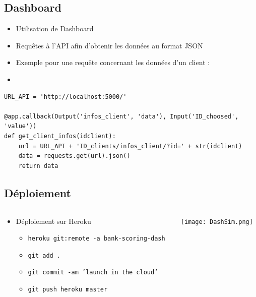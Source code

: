\documentclass[8pt,aspectratio=169,hyperref={unicode=true}]{beamer}
\begin{document}
\subsection{Dashboard}
\begin{frame}[fragile]{\insertsection}{\insertsubsection}
    \begin{itemize}
        \item Utilisation de Dashboard
        \item Requêtes à l'API afin d'obtenir les données au format JSON
        \item Exemple pour une requête concernant les données d'un client :
        \item[]
    \end{itemize}
    \begin{verbatim}
URL_API = 'http://localhost:5000/'

@app.callback(Output('infos_client', 'data'), Input('ID_choosed', 'value'))
def get_client_infos(idclient):
    url = URL_API + 'ID_clients/infos_client/?id=' + str(idclient)
    data = requests.get(url).json()
    return data 
            \end{verbatim}
\end{frame}

\subsection{Déploiement}
\begin{frame}{\insertsection}{\insertsubsection}
    \begin{columns}
        \begin{column}{.4\textwidth}
            \begin{itemize}
                \item Déploiement sur Heroku
                      \begin{itemize}
                          \item \texttt{heroku git:remote -a bank-scoring-dash}
                          \item \texttt{git add .}
                          \item \texttt{git commit -am 'launch in the cloud'}
                          \item \texttt{git push heroku master}
                      \end{itemize}
            \end{itemize}
        \end{column}
        \begin{column}{.6\textwidth}
            \texttt{[image: DashSim.png]}
        \end{column}
    \end{columns}
\end{frame}
\end{document}
